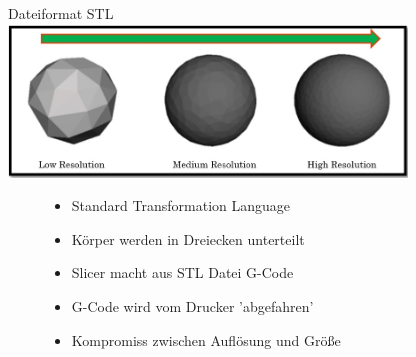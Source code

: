 \begin{frame}{Dateiformat STL}
    \centering
    \includegraphics[width=300pt]{img_niklas/stl.jpg}
    \begin{figure}
        \centering
        \begin{minipage}[m]{0.3\textwidth}
        \begin{itemize}
            \item Standard Transformation Language
            \item Körper werden in Dreiecken unterteilt
        \end{itemize}
        \end{minipage}
        \begin{minipage}[m]{0.3\textwidth}
        \begin{itemize}
            \item Slicer macht aus STL Datei G-Code
            \item G-Code wird vom Drucker 'abgefahren'
        \end{itemize}
        \end{minipage}
        \begin{minipage}[m]{0.3\textwidth}
        \begin{itemize}
            \item Kompromiss zwischen Auflösung und Größe
        \end{itemize}
        \end{minipage}
    \end{figure}
    
\end{frame}